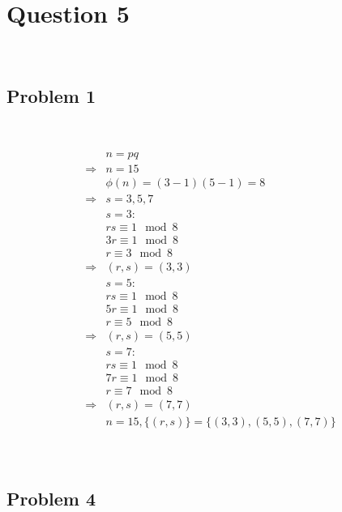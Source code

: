 \documentclass{article}
\begin{document}
\newpage

\section*{Question 5}

~

\subsection*{Problem 1}

~

\begin{align*}
    &n=pq\\
    \Rightarrow&n=15\\
    &\phi(n)=(3-1)(5-1)=8\\
    \Rightarrow&s=3,5,7\\
    &s=3:\\
    &rs\equiv 1\mod 8\\
    &3r\equiv 1\mod 8\\
    &r\equiv 3\mod8\\
    \Rightarrow&(r,s)=(3,3)\\
    &s=5:\\
    &rs\equiv 1\mod 8\\
    &5r\equiv 1\mod8\\
    &r\equiv 5\mod 8\\
    \Rightarrow&(r,s)=(5,5)\\
    &s=7:\\
    &rs\equiv 1\mod 8\\
    &7r\equiv 1\mod8\\
    &r\equiv 7\mod8\\
    \Rightarrow&(r,s)=(7,7)\\
    &n=15,\{(r,s)\}=\{(3,3),(5,5),(7,7)\}\\
\end{align*}

~

\subsection*{Problem 4}

~
\end{document}
